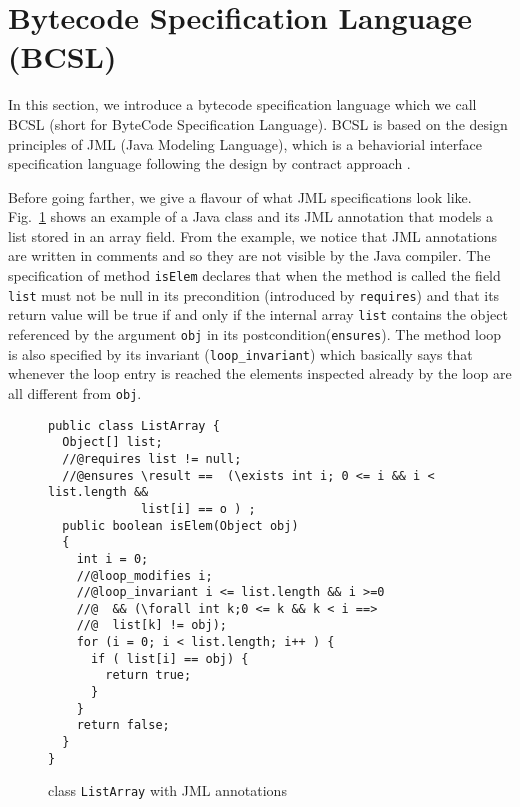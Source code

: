 
\section{Bytecode Specification Language (BCSL)}\label{bcSpecLg}

In this section, we introduce a bytecode specification language which we call BCSL (short for ByteCode Specification Language).
 BCSL is based on the design principles of JML (Java Modeling Language), which is a behaviorial interface specification 
language following the design by contract approach \cite{M97oos}.


Before going farther, we give a flavour of what JML specifications look like. Fig.~\ref{replaceSrc} shows an example of a Java class and its 
JML annotation that models a list stored in an array field. 
From the example, we notice that JML annotations are written in comments and so they are not visible by the Java compiler.
The specification of method \verb!isElem! declares
 that when the method is called the field \verb!list! must not be null in its precondition (introduced by \verb!requires!) and that its return value will be true if and only if the internal array 
\verb!list! contains the object referenced by the argument \verb!obj! in its postcondition(\verb!ensures!). The method loop is also specified by
its invariant (\verb!loop_invariant!) which basically says that whenever the loop entry is reached the elements inspected already by the loop are all different from \verb!obj!.

 
\begin{figure}[!h]
\begin{verbatim}
public class ListArray {
  Object[] list;
  //@requires list != null;
  //@ensures \result ==  (\exists int i; 0 <= i && i < list.length &&  
             list[i] == o ) ; 
  public boolean isElem(Object obj)
  {
    int i = 0;
    //@loop_modifies i;
    //@loop_invariant i <= list.length && i >=0 
    //@  && (\forall int k;0 <= k && k < i ==> 
    //@  list[k] != obj); 
    for (i = 0; i < list.length; i++ ) {
      if ( list[i] == obj) {
        return true;	
      }
    }
    return false;
  }
}
\end{verbatim}
\caption{class \texttt{ListArray} with JML annotations} 
\label{replaceSrc}
\end{figure}

